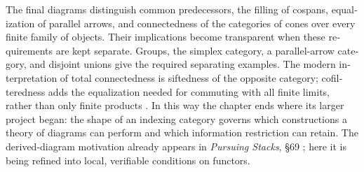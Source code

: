 \begin{otherlanguage}{english}
The final diagrams distinguish common predecessors, the filling of
cospans, equalization of parallel arrows, and connectedness of the
categories of cones over every finite family of objects. Their implications
become transparent when these requirements are
kept separate. Groups, the simplex category, a parallel-arrow category,
and disjoint unions give the required separating examples. The modern
interpretation of total connectedness is siftedness of the opposite
category; cofilteredness adds the equalization needed for commuting with
all finite limits, rather than only finite products
\citep{AdamekRosickyVitale2010,StacksFiltered2026,Tendas2024}. In this way the
chapter ends where its larger project began: the shape of an indexing
category governs which constructions a theory of diagrams can perform
and which information restriction can retain. The derived-diagram
motivation already appears in \emph{Pursuing Stacks}, \S69
\citep{Grothendieck1983}; here it is being refined into local, verifiable
conditions on functors.

\endgroup
\end{otherlanguage}
\dgrchunkend
